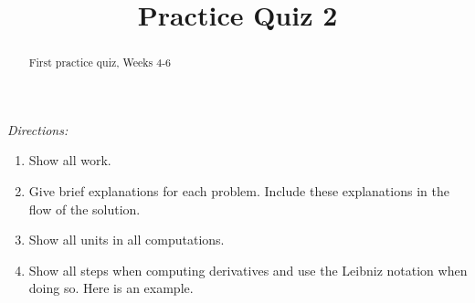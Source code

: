 \documentclass{ximera}
\title{Practice Quiz 2}
\begin{document}
\begin{abstract}
First practice quiz, Weeks 4-6
\end{abstract}
\maketitle

\emph{Directions:}

\begin{enumerate}
\item Show all work.

\item Give brief explanations for each problem. Include these explanations in the flow of the solution.

\item Show all units in all computations.

\item Show all steps when computing derivatives and use the Leibniz notation when doing so. Here is an example.

\end{enumerate}
\end{document}
